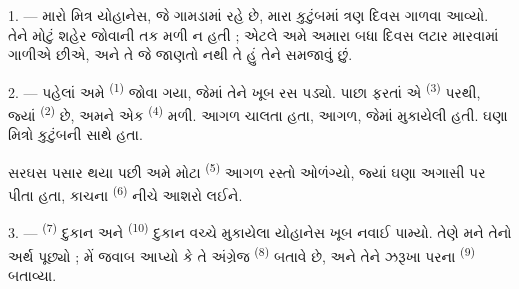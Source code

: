 %

\VUsaut{4.0mm}
\VUsaut{3.0mm}

\VUsaut{3.0mm}

1. --- મારો મિત્ર યોહાનેસ, જે ગામડામાં રહે છે, મારા કુટુંબમાં ત્રણ
દિવસ ગાળવા આવ્યો.  તેને મોટું શહેર જોવાની તક મળી ન
હતી ; એટલે અમે અમારા બધા દિવસ લટાર મારવામાં ગાળીએ છીએ, અને તે જે
જાણતો નથી તે હું તેને સમજાવું છું.

2. --- પહેલાં અમે  \textsuperscript{(1)} જોવા ગયા, જેમાં
તેને ખૂબ રસ પડ્યો. પાછા ફરતાં એ  \textsuperscript{(3)}
પરથી, જ્યાં  \textsuperscript{(2)} છે, અમને એક
 \textsuperscript{(4)} મળી. 
આગળ  ચાલતા હતા,  આગળ, જેમાં
 મુકાયેલી હતી. ઘણા મિત્રો  કુટુંબની
સાથે હતા.

સરઘસ પસાર થયા પછી અમે મોટા  \textsuperscript{(5)} આગળ
રસ્તો ઓળંગ્યો, જ્યાં ઘણા  અગાસી પર 
પીતા હતા, કાચના  \textsuperscript{(6)} નીચે આશરો લઈને.

3. ---  \textsuperscript{(7)} દુકાન અને
 \textsuperscript{(10)} દુકાન વચ્ચે મુકાયેલા
 યોહાનેસ ખૂબ નવાઈ પામ્યો. તેણે મને તેનો અર્થ
પૂછ્યો ; મેં જવાબ આપ્યો કે તે અંગ્રેજ 
\textsuperscript{(8)} બતાવે છે, અને તેને ઝરૂખા પરના
 \textsuperscript{(9)} બતાવ્યા.

\VUsaut{3.0mm}

